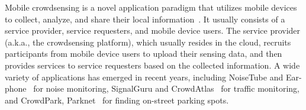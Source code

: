 \documentclass[conference,compsocconf,letterpaper,10pt]{IEEEtran}
\newcommand{\eg}{{\em e.g.}}
\newcommand{\et}{{\em et al. }}
\begin{document}


Mobile crowdsensing is a novel application paradigm that utilizes mobile devices to collect, analyze, and share their local information~\cite{ganti2011mobile,lane2010survey}. It usually consists of a service provider, service requesters, and mobile device users. The service provider (a.k.a., the crowdsensing platform), which usually resides in the cloud, recruits participants from mobile device users to upload their sensing data, and then provides services to service requesters based on the collected information. A wide variety of applications has emerged in recent years, including NoiseTube and Ear-phone~\cite{maisonneuve2009noisetube,rana2010ear} for noise monitoring, SignalGuru and CrowdAtlas~\cite{koukoumidis2011signalguru,wang2013crowdatlas} for traffic monitoring, and CrowdPark, Parknet~\cite{yan2011crowdpark,mathur2010parknet} for finding on-street parking spots.
\end{document}

